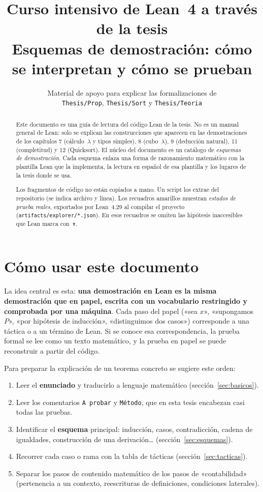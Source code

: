 \documentclass[11pt,a4paper]{article}
\title{\textbf{Curso intensivo de Lean~4 a través de la tesis}\\[4pt]
  \large Esquemas de demostración: cómo se interpretan y cómo se prueban}
\author{Material de apoyo para explicar las formalizaciones de\\
  \texttt{Thesis/Prop}, \texttt{Thesis/Sort} y \texttt{Thesis/Teoria}}
\date{}
\begin{document}
\maketitle
\thispagestyle{empty}

\begin{abstract}
\noindent
Este documento es una guía de lectura del código Lean de la tesis. No es un
manual general de Lean: solo se explican las construcciones que aparecen en
las demostraciones de los capítulos 7 (cálculo~\(\lambda\) y tipos simples),
8 (cubo~\(\lambda\)), 9 (deducción natural), 11 (completitud) y 12
(Quicksort). El núcleo del documento es un catálogo de \emph{esquemas de
demostración}. Cada esquema enlaza una forma de razonamiento matemático con la
plantilla Lean que la implementa, la lectura en español de esa plantilla y los
lugares de la tesis donde se usa.

Los fragmentos de código no están copiados a mano. Un script los extrae del
repositorio (se indica archivo y línea). Los recuadros amarillos muestran
\emph{estados de prueba reales}, exportados por Lean~4.29 al compilar el
proyecto (\texttt{artifacts/explorer/*.json}). En esos recuadros se omiten las
hipótesis inaccesibles que Lean marca con~\texttt{✝}.
\end{abstract}

\tableofcontents
\newpage

\section{Cómo usar este documento}

La idea central es esta: \textbf{una demostración en Lean es la misma
demostración que en papel, escrita con un vocabulario restringido y
comprobada por una máquina}. Cada paso del papel («sea \(x\)», «supongamos
\(P\)», «por hipótesis de inducción», «distinguimos dos casos») corresponde a
una táctica o a un término de Lean. Si se conoce esa correspondencia, la prueba
formal se lee como un texto matemático, y la prueba en papel se puede
reconstruir a partir del código.

Para preparar la explicación de un teorema concreto se sugiere este orden:
\begin{enumerate}
  \item Leer el \textbf{enunciado} y traducirlo a lenguaje matemático (sección~\ref{sec:basicos}).
  \item Leer los comentarios \texttt{A probar} y \texttt{Método}, que en esta tesis encabezan casi todas las pruebas.
  \item Identificar el \textbf{esquema} principal: inducción, casos, contradicción, cadena de igualdades, construcción de una derivación\ldots{} (sección~\ref{sec:esquemas}).
  \item Recorrer cada caso o rama con la tabla de tácticas (sección~\ref{sec:tacticas}).
  \item Separar los pasos de contenido matemático de los pasos de «contabilidad» (pertenencia a un contexto, reescrituras de definiciones, condiciones laterales).
\end{enumerate}
\end{document}
